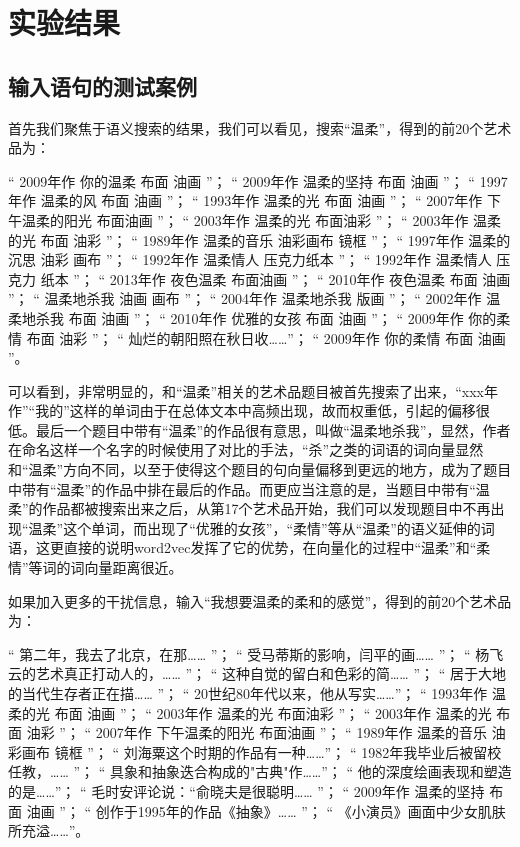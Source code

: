 \chapter{实验结果}

\section{输入语句的测试案例}

首先我们聚焦于语义搜索的结果，我们可以看见，搜索“温柔”，得到的前20个艺术品为：

\footnotesize
“ 2009年作 你的温柔 布面 油画 ”；
“ 2009年作 温柔的坚持 布面 油画 ”；
“ 1997年作 温柔的风 布面 油画 ”；
“ 1993年作 温柔的光 布面 油画 ”；
“ 2007年作 下午温柔的阳光 布面油画 ”；
“ 2003年作 温柔的光 布面油彩 ”；
“ 2003年作 温柔的光 布面 油彩 ”；
“ 1989年作 温柔的音乐 油彩画布 镜框 ”；
“ 1997年作 温柔的沉思 油彩 画布 ”；
“ 1992年作 温柔情人 压克力纸本 ”；
“ 1992年作 温柔情人 压克力 纸本 ”；
“ 2013年作 夜色温柔 布面油画 ”；
“ 2010年作 夜色温柔 布面 油画 ”；
“ 温柔地杀我 油画 画布 ”；
“ 2004年作 温柔地杀我 版画 ”；
“ 2002年作 温柔地杀我 布面 油画 ”；
“ 2010年作 优雅的女孩 布面 油画 ”；
“ 2009年作 你的柔情 布面 油彩 ”；
“ 灿烂的朝阳照在秋日收……”；
“ 2009年作 你的柔情 布面 油画 ”。

\normalsize
可以看到，非常明显的，和“温柔”相关的艺术品题目被首先搜索了出来，“xxx年作”“我的”这样的单词由于在总体文本中高频出现，故而权重低，引起的偏移很低。最后一个题目中带有“温柔”的作品很有意思，叫做“温柔地杀我”，显然，作者在命名这样一个名字的时候使用了对比的手法，“杀”之类的词语的词向量显然和“温柔”方向不同，以至于使得这个题目的句向量偏移到更远的地方，成为了题目中带有“温柔”的作品中排在最后的作品。而更应当注意的是，当题目中带有“温柔”的作品都被搜索出来之后，从第17个艺术品开始，我们可以发现题目中不再出现“温柔”这个单词，而出现了“优雅的女孩”，“柔情”等从“温柔”的语义延伸的词语，这更直接的说明word2vec发挥了它的优势，在向量化的过程中“温柔”和“柔情”等词的词向量距离很近。

如果加入更多的干扰信息，输入“我想要温柔的柔和的感觉”，得到的前20个艺术品为：

\footnotesize
“ 第二年，我去了北京，在那…… ”；
“ 受马蒂斯的影响，闫平的画…… ”；
“ 杨飞云的艺术真正打动人的，…… ”；
“ 这种自觉的留白和色彩的简…… ”；
“ 居于大地的当代生存者正在描…… ”；
“ 20世纪80年代以来，他从写实……”；
“ 1993年作 温柔的光 布面 油画 ”；
“ 2003年作 温柔的光 布面油彩 ”；
“ 2003年作 温柔的光 布面 油彩 ”；
“ 2007年作 下午温柔的阳光 布面油画 ”；
“ 1989年作 温柔的音乐 油彩画布 镜框 ”；
“ 刘海粟这个时期的作品有一种……”；
“ 1982年我毕业后被留校任教，…… ”；
“ 具象和抽象迭合构成的"古典"作……”；
“ 他的深度绘画表现和塑造的是……”；
“ 毛时安评论说：“俞晓夫是很聪明…… ”；
“ 2009年作 温柔的坚持 布面 油画 ”；
“ 创作于1995年的作品《抽象》…… ”；
“ 《小演员》画面中少女肌肤所充溢……”。

